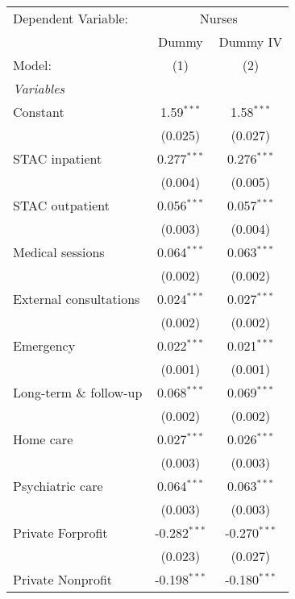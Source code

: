 
\begingroup
\centering
\begin{tabular}{lcc}
   \tabularnewline \midrule \midrule
   Dependent Variable: & \multicolumn{2}{c}{Nurses}\\
                           & Dummy          & Dummy IV \\   
   Model:                  & (1)            & (2)\\  
   \midrule
   \emph{Variables}\\
   Constant                & 1.59$^{***}$   & 1.58$^{***}$\\   
                           & (0.025)        & (0.027)\\   
   STAC inpatient          & 0.277$^{***}$  & 0.276$^{***}$\\   
                           & (0.004)        & (0.005)\\   
   STAC outpatient         & 0.056$^{***}$  & 0.057$^{***}$\\   
                           & (0.003)        & (0.004)\\   
   Medical sessions        & 0.064$^{***}$  & 0.063$^{***}$\\   
                           & (0.002)        & (0.002)\\   
   External consultations  & 0.024$^{***}$  & 0.027$^{***}$\\   
                           & (0.002)        & (0.002)\\   
   Emergency               & 0.022$^{***}$  & 0.021$^{***}$\\   
                           & (0.001)        & (0.001)\\   
   Long-term \& follow-up  & 0.068$^{***}$  & 0.069$^{***}$\\   
                           & (0.002)        & (0.002)\\   
   Home care               & 0.027$^{***}$  & 0.026$^{***}$\\   
                           & (0.003)        & (0.003)\\   
   Psychiatric care        & 0.064$^{***}$  & 0.063$^{***}$\\   
                           & (0.003)        & (0.003)\\   
   Private Forprofit       & -0.282$^{***}$ & -0.270$^{***}$\\   
                           & (0.023)        & (0.027)\\   
   Private Nonprofit       & -0.198$^{***}$ & -0.180$^{***}$\\   

\end{tabular}
